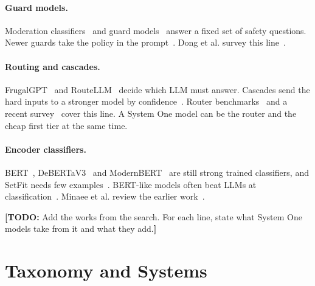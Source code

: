 \documentclass[acmsmall,nonacm,screen]{acmart}
\newcommand{\todo}[1]{{\color{red}\textbf{[TODO: }#1\textbf{]}}}
\newcommand{\sone}{System One model\xspace}
\newcommand{\sones}{System One models\xspace}
\begin{document}
\paragraph{Guard models.} Moderation classifiers~\cite{markov2022holistic} and guard models~\cite{inan2023llama,zeng2024shieldgemma,han2024wildguard,padhi2024granite} answer a fixed set of safety questions. Newer guards take the policy in the prompt~\cite{openai2025gptoss120b}. Dong et al. survey this line~\cite{dong2024safeguarding}.

\paragraph{Routing and cascades.} FrugalGPT~\cite{chen2023frugalgpt} and RouteLLM~\cite{ong2024routellm} decide which LLM must answer. Cascades send the hard inputs to a stronger model by confidence~\cite{gupta2024language,nie2024online}. Router benchmarks~\cite{hu2024routerbench,li2026llmrouterbench} and a recent survey~\cite{moslem2026dynamic} cover this line. A \sone can be the router and the cheap first tier at the same time.

\paragraph{Encoder classifiers.} BERT~\cite{devlin2018bert}, DeBERTaV3~\cite{he2021debertav3} and ModernBERT~\cite{warner2024smarter} are still strong trained classifiers, and SetFit needs few examples~\cite{tunstall2022efficient}. BERT-like models often beat LLMs at classification~\cite{zhang2025bertlike}. Minaee et al. review the earlier work~\cite{minaee2020deep}.

\todo{Add the works from the search. For each line, state what \sones take from it and what they add.}

\section{Taxonomy and Systems}
\label{sec:taxonomy}
\end{document}
